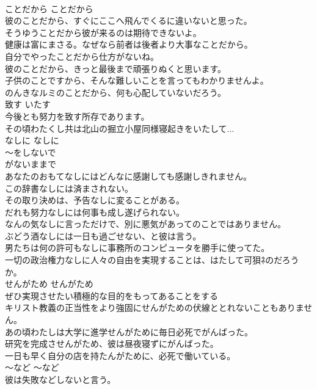 \documentclass[8pt]{extreport}
\begin{document}
\begin{CJK}{UTF8}{min}
\\	ことだから	ことだから	
\\	彼のことだから、すぐにここへ飛んでくるに違いないと思った。  
\\	そうゆうことだから彼が来るのは期待できないよ。   
\\	健康は富にまさる。なぜなら前者は後者より大事なことだから。   
\\	自分でやったことだから仕方がないね。   
\\	彼のことだから、きっと最後まで頑張りぬくと思います。  
\\	子供のことですから、そんな難しいことを言ってもわかりませんよ。  
\\	のんきなルミのことだから、何も心配していないだろう。  
\\	致す	いたす	
\\	今後とも努力を致す所存であります。  
\\	その頃わたくし共は北山の掘立小屋同様寝起きをいたして...   
\\	なしに	なしに	
\\	〜をしないで 
\\	がないままで
\\	あなたのおもてなしにはどんなに感謝しても感謝しきれません。  
\\	この辞書なしには済まされない。   
\\	その取り決めは、予告なしに変ることがある。  
\\	だれも努力なしには何事も成し遂げられない。   
\\	なんの気なしに言っただけで、別に悪気があってのことではありません。   
\\	ぶどう酒なしには一日も過ごせない、と彼は言う。   
\\	男たちは何の許可もなしに事務所のコンピュータを勝手に使ってた。  
\\	一切の政治権力なしに人々の自由を実現することは、はたして可狽ﾈのだろうか。  
\\	せんがため	せんがため	
\\	ぜひ実現させたい積極的な目的をもってあることをする	
\\	キリスト教義の正当性をより強固にせんがための伏線ととれないこともありません。  
\\	あの頃わたしは大学に進学せんがために毎日必死でがんばった。   
\\	研究を完成させんがため、彼は昼夜寝ずにがんばった。   
\\	一日も早く自分の店を持たんがために、必死で働いている。  
\\	〜など	〜など	
\\	彼は失敗などしないと言う。  

\end{CJK}
\end{document}
